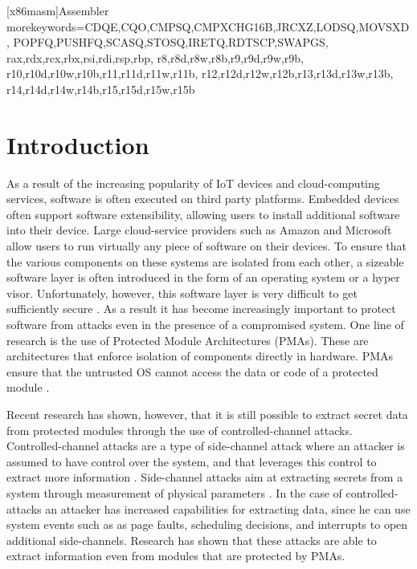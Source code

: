 
   [x86masm]{Assembler} %
   {morekeywords={CDQE,CQO,CMPSQ,CMPXCHG16B,JRCXZ,LODSQ,MOVSXD, %
                  POPFQ,PUSHFQ,SCASQ,STOSQ,IRETQ,RDTSCP,SWAPGS, %
                  rax,rdx,rcx,rbx,rsi,rdi,rsp,rbp, %
                  r8,r8d,r8w,r8b,r9,r9d,r9w,r9b, %
                  r10,r10d,r10w,r10b,r11,r11d,r11w,r11b, %
                  r12,r12d,r12w,r12b,r13,r13d,r13w,r13b, %
                  r14,r14d,r14w,r14b,r15,r15d,r15w,r15b}} %


\chapter{Introduction}
\label{cha:introduction}
As a result of the increasing popularity of IoT devices and cloud-computing services, software is often executed on third party platforms. 
Embedded devices often support software extensibility, allowing users to install additional software into their device. 
Large cloud-service providers such as Amazon and Microsoft allow users to run virtually any piece of software on their devices. 
To ensure that the various components on these systems are isolated from each other, a sizeable software layer is often introduced in the form of an operating system or 
a hyper visor.
Unfortunately, however, this software layer is very difficult to get sufficiently secure \cite{psma}.
As a result it has become increasingly important to protect software from attacks even in the presence of a compromised system. 
One line of research is the use of Protected Module Architectures (PMAs). 
These are architectures that enforce isolation of components directly in hardware.
PMAs ensure that the untrusted OS cannot access the data or code of a protected module \cite{Nemesis}. 

Recent research has shown, however, that it is still possible to extract secret data from protected modules through the use of controlled-channel attacks. 
Controlled-channel attacks are a type of side-channel attack where an attacker is assumed to have control over the system, and that leverages this control to extract more information \cite{Xu}.	
Side-channel attacks aim at extracting secrets from a system through measurement of physical parameters \cite{side-channel}. 
In the case of controlled-attacks an attacker has increased capabilities for extracting data, since he can use system events such as as page faults, scheduling decisions, and interrupts to open additional side-channels. 
Research has shown that these attacks are able to extract information even from modules that are protected by PMAs. 

